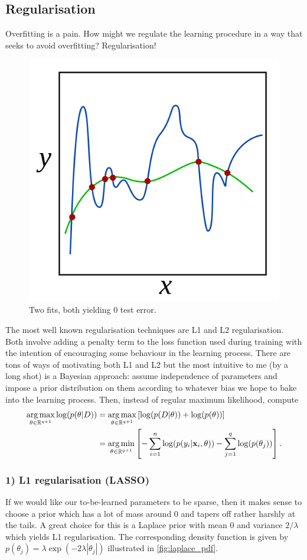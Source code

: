 \documentclass[11pt]{article}
\begin{document}
\subsection{Regularisation}
Overfitting is a pain. How might we regulate the learning procedure in a way that seeks to avoid overfitting? Regularisation!

\begin{figure}[t]
    \centering
    \includegraphics[width=0.5\columnwidth]{./figures/supervised_learning/regularisation_two_plots_zero_test_error.png}
    \caption{Two fits, both yielding 0 test error. }
    \label{fig:regularisation_two_plots}
\end{figure}

The most well known regularisation techniques are L1 and L2 regularisation. Both involve adding a penalty term to the loss function used during training with the intention of encouraging some behaviour in the learning process. There are tons of ways of motivating both L1 and L2 but the most intuitive to me (by a long shot) is a Bayesian approach: assume independence of parameters and impose a prior distribution on them according to whatever bias we hope to bake into the learning process. Then, instead of regular maximum likelihood, compute
\begin{align*}
    \operatorname*{arg\,max}_{\theta\in\mathbb{R}^{q+1}}\log(p(\theta|D))
    &=
    \operatorname*{arg\,max}_{\theta\in\mathbb{R}^{q+1}}\left[\log(p(D|\theta))+\log(p(\theta))\right]\\
    &=
    \operatorname*{arg\,min}_{\theta\in\mathbb{R}^{q+1}}\left[-\sum_{i=1}^n\log(p(y_i|\mathbf{x}_i,\theta))-\sum_{j=1}^q\log(p(\theta_j))\right].
\end{align*}

\subsubsection*{1) L1 regularisation (LASSO)}
If we would like our to-be-learned parameters to be sparse, then it makes sense to choose a prior which has a lot of mass around 0 and tapers off rather harshly at the tails. A great choice for this is a Laplace prior with mean 0 and variance $2/\lambda$ which yields L1 regularisation. The corresponding density function is given by $p(\theta_j)=\lambda\exp(-2\lambda|\theta_j|)$ illustrated in \autoref{fig:laplace_pdf}.
\end{document}
